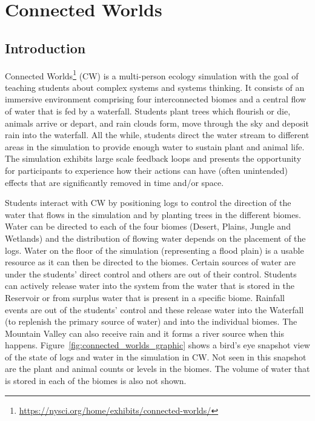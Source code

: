 \section{Connected Worlds}\label{sec:connected_worlds}


\subsection{Introduction}\label{sec:connected_worlds_intro}
Connected Worlds\footnote{\url{https://nysci.org/home/exhibits/connected-worlds/}} (CW) is a multi-person ecology simulation with the goal of teaching students about complex systems and systems thinking.  It consists of an immersive environment comprising four interconnected biomes and a central flow of water that is fed by a waterfall. Students plant trees which flourish or die, animals arrive or depart, and rain clouds form, move through the sky and deposit rain into the waterfall. All the while, students direct the water stream to different areas in the simulation to provide enough water to sustain plant and animal life. The simulation exhibits large scale feedback loops and presents the opportunity for participants to experience how their actions can have (often unintended) effects that are significantly removed in time and/or space.

Students interact with CW by positioning logs to control the direction of the water that flows in the simulation and by planting trees in the different biomes. Water can be directed to each of the four biomes (Desert, Plains, Jungle and Wetlands) and the distribution of flowing water depends on the placement of the logs. Water on the floor of the simulation (representing a flood plain) is a usable resource as it can then be directed to the biomes. Certain sources of water are under the students' direct control and others are out of their control. Students can actively release water into the system from the water that is stored in the Reservoir or from surplus water that is present in a specific biome. Rainfall events are out of the students' control and these release water into the Waterfall (to replenish the primary source of water) and into the individual biomes. The Mountain Valley can also receive rain and it forms a river source when this happens. Figure~\ref{fig:connected_worlds_graphic} shows a bird's eye snapshot view of the state of logs and water in the simulation in CW. Not seen in this snapshot are the plant and animal counts or levels in the biomes. The volume of water that is stored in each of the biomes is also not shown.

